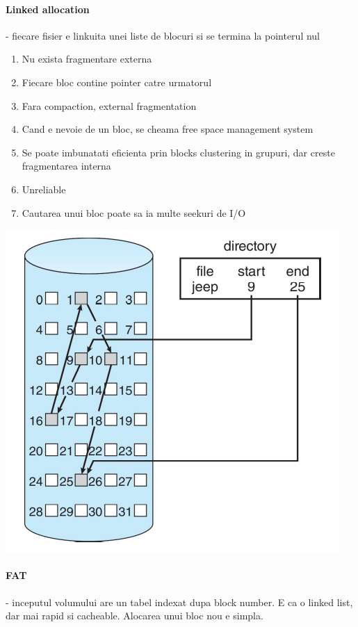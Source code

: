 \documentclass{article}
\begin{document}
\paragraph*{Linked allocation} - fiecare fisier e linkuita unei liste de blocuri si se termina la pointerul nul
\begin{enumerate}
    \item Nu exista fragmentare externa
    \item Fiecare bloc contine pointer catre urmatorul
    \item Fara compaction, external fragmentation
    \item Cand e nevoie de un bloc, se cheama free space management system
    \item Se poate imbunatati eficienta prin blocks clustering in grupuri, dar creste fragmentarea interna
    \item Unreliable
    \item Cautarea unui bloc poate sa ia multe seekuri de I/O
\end{enumerate}
\begin{center}
    \includegraphics[scale=0.4]{48-linkedalloc.png}
\end{center}

\paragraph*{FAT} - inceputul volumului are un tabel indexat dupa block number. E ca o linked list, dar mai rapid si cacheable. Alocarea unui bloc nou e simpla.
\end{document}
